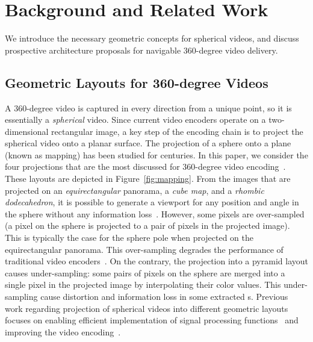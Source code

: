 \section{Background and Related Work}
\label{sec:related}

We introduce the necessary geometric concepts for spherical
videos, and discuss prospective architecture
proposals for navigable $360$-degree video delivery.

\subsection{Geometric Layouts for 360-degree Videos}

A $360$-degree video is captured in every direction from a unique point,
so it is essentially a \emph{spherical} video. Since current video encoders
operate on a two-dimensional rectangular image, a key step of the
encoding chain is to project the spherical video onto a planar
surface. The projection of a sphere onto a plane (known as mapping)
has been studied for centuries. In this paper, we consider the four
projections that are the most discussed for $360$-degree video
encoding~\cite{yu_framework_2015}. These layouts are depicted in
Figure~\ref{fig:mapping}.
From the images that are projected on an \textit{equirectangular}
panorama, a \textit{cube map}, and a \textit{rhombic dodecahedron}, it
is possible to generate a viewport for any position and angle in the
sphere without any information loss~\cite{Ng2005, fu_rhombic_2009}.
However, some pixels are over-sampled (a pixel on the sphere is
projected to a pair of pixels in the projected image). This is
typically the case for the sphere pole when projected on the
equirectangular panorama. This over-sampling degrades the performance
of traditional video encoders~\cite{wojciechowski_h.264_2006,
yu_framework_2015}. On the contrary, the projection into a pyramid
layout causes under-sampling: some pairs of pixels on the sphere
are merged into a
single pixel in the projected image by interpolating their color
values. This under-sampling cause distortion and information loss in
some extracted \FoV{}s. Previous work regarding projection of spherical
videos into different geometric layouts focuses on enabling efficient
implementation of signal processing
functions~\cite{kazhdan_metric-aware_2010} and improving the video
encoding~\cite{tosic_low_2009}.

